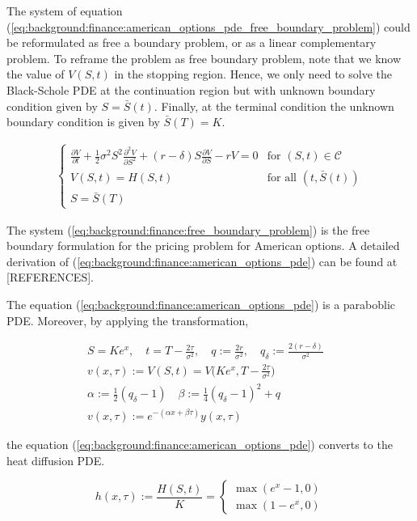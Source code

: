 The system of equation (\ref*{eq:background:finance:american_options_pde_free_boundary_problem}) could
be reformulated as free a boundary problem, or as a linear complementary problem. To 
reframe the problem as free boundary problem, note that we know the value of $V(S,t)$
in the stopping region. Hence, we only need to solve the Black-Schole PDE at the
continuation region but with unknown boundary condition given by $S=\bar{S}(t)$. 
Finally, at the terminal condition the unknown boundary condition is given by 
$\bar{S}(T) = K$.

\begin{align}
  \begin{cases}
  \frac{\partial{V}}{\partial{t}} + \frac{1}{2}\sigma^{2} S^2 \frac{\partial^2{V}}{\partial{S^2}} + (r - \delta)S \frac{\partial{V}}{\partial{S}} - rV = 0 & \text{for $(S, t) \in \mathcal{C}$} \\
  V(S, t) = H(S, t) & \text{for all $(t, \bar{S}(t))$} \\
  S = \bar{S}(T)
  \end{cases}
  \label{eq:background:finance:free_boundary_problem}
\end{align}

The system (\ref{eq:background:finance:free_boundary_problem}) 
is the free boundary formulation for the pricing problem for American options.
A detailed derivation of (\ref{eq:background:finance:american_options_pde}) 
can be found at [REFERENCES].


The equation (\ref*{eq:background:finance:american_options_pde}) 
is a paraboblic PDE. Moreover, by applying the transformation,

\begin{align}
  S = Ke^x, \quad t = T - \frac{2\tau}{\sigma^2}, \quad q := \frac{2r}{\sigma^2}, \quad q_{\delta} := \frac{2(r-\delta)}{\sigma^2} & \\
  v(x, \tau) := V(S, t) = V\big(Ke^x, T - \frac{2\tau}{\sigma^2}\big) \\
  \alpha := \frac{1}{2}(q_{\delta} - 1) \quad \beta := \frac{1}{4}(q_{\delta} - 1)^2 + q  \\
  v(x, \tau) := e^{-(\alpha x + \beta \tau)}y(x, \tau)
\end{align}

the equation (\ref*{eq:background:finance:american_options_pde}) converts 
to the heat diffusion PDE.

\begin{equation}
  h(x, \tau) := \frac{H(S, t)}{K} = \begin{cases}
    \max(e^{x} - 1, 0)\\
    \max(1 - e^{x}, 0)
  \end{cases} 
\end{equation}

